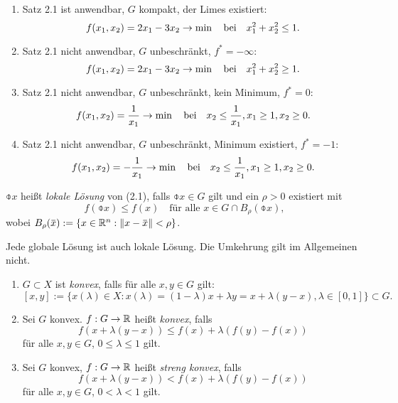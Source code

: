 \begin{exmp}
  \begin{enumerate}[(1)]
  \item Satz 2.1 ist anwendbar, $G$ kompakt, der Limes existiert:
    \[ f(x_1, x_2) = 2 x_1 - 3 x_2 \to \min \quad \text{bei} \quad x_1^2 + x_2^2 \le 1. \]
  \item Satz 2.1 nicht anwendbar, $G$ unbeschränkt, $f^* = - \infty$:
    \[ f(x_1, x_2) = 2 x_1 - 3 x_2 \to \min \quad \text{bei} \quad x_1^2 + x_2^2 \ge 1. \]
  \item Satz 2.1 nicht anwendbar, $G$ unbeschränkt, kein Minimum, $f^* = 0$:
    \[ f(x_1, x_2) = \frac{1}{x_1} \to \min \quad \text{bei} \quad x_2 \le \frac{1}{x_1}, x_1 \ge 1,
      x_2 \ge 0. \]
  \item Satz 2.1 nicht anwendbar, $G$ unbeschränkt, Minimum existiert, $f^* =
    -1$:
    \[ f(x_1, x_2) = -\frac{1}{x_1} \to \min \quad \text{bei} \quad x_2 \le \frac{1}{x_1}, x_1 \ge 1,
      x_2 \ge 0. \]
  \end{enumerate}
\end{exmp}

\begin{defn}
  $\obar{x}$ heißt \emph{lokale Lösung} von (2.1), falls $\obar{x} \in G$ gilt
  und ein $\rho > 0$ existiert mit
  \[ f( \obar{x} ) \le f(x) \quad \text{für alle } x \in G \cap
    B_\rho(\obar{x}), \]
  wobei $B_\rho(\obar{x}) := \{ x \in \real^n : \| x - \obar{x} \| < \rho \}$.
\end{defn}

\begin{rmrk}
  Jede globale Lösung ist auch lokale Lösung. Die Umkehrung gilt im Allgemeinen
  nicht.
\end{rmrk}

\begin{defn}
  \begin{enumerate}[(1)]
  \item $G \subset X$ ist \emph{konvex}, falls für alle $x,y \in G$ gilt:
    \[ [x,y] := \{ x(\lambda) \in X: x(\lambda) = (1-\lambda)x + \lambda y = x +
      \lambda(y-x), \lambda \in [0,1] \} \subset G. \]
  \item Sei $G$ konvex. $f: G \to \mathbb{R}$ heißt \emph{konvex}, falls
    \[ f( x + \lambda(y-x) ) \le f(x) + \lambda( f(y) - f(x) ) \]
    für alle $x,y \in G$, $0 \le \lambda \le 1$ gilt.
  \item Sei $G$ konvex, $f: G \to \mathbb{R}$ heißt \emph{streng konvex}, falls
    \[ f( x + \lambda(y-x) ) < f(x) + \lambda( f(y) - f(x) ) \]
    für alle $x,y \in G$, $0 < \lambda < 1$ gilt.
  \end{enumerate}
\end{defn}

